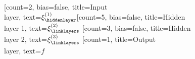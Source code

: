 \documentclass{standalone}
\begin{document}
    \begin{neuralnetwork}[height=6]
        \newcommand{\xinputs}{$x$, $logx$}
        \newcommand{\x}[2]{$\xi^{(1)}_#2$}
        \newcommand{\y}[2]{$f$}
        \newcommand{\hfirst}[2]{\small $\xi^{(2)}_#2$}
        \newcommand{\hsecond}[2]{\small $\xi^{(3)}_#2$}
        [count=2, bias=false, title=Input\\layer, text=\x]
        \hiddenlayer[count=5, bias=false, title=Hidden\\layer 1, text=\hfirst] \linklayers
        \hiddenlayer[count=3, bias=false, title=Hidden\\layer 2, text=\hsecond] \linklayers
        \outputlayer[count=1, title=Output\\layer, text=\y] \linklayers
    \end{neuralnetwork}
\end{document}
